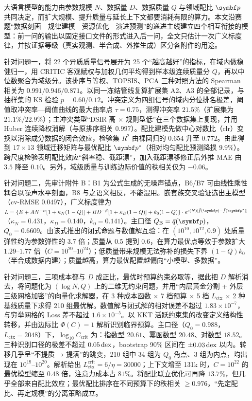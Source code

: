 大语言模型的能力由参数规模 $N$、数据量 $D$、数据质量 $Q$ 与领域配比 $\bp$ 共同决定，而扩大规模、提升质量与延长上下文都要消耗有限的算力。本文沿赛题“数据刻画—规律建模—资源优化—演进预测”的递进主线建立四个相互衔接的模型：前一问的输出以固定接口文件的形式进入后一问，全文只估计一次广义标度律，并按证据等级（真实观测、半合成、外推生成）区分各附件的用途。

针对问题一，将 22 个异质质量信号展开为 25 个“越高越好”的指标，在域内做稳健归一，用 CRITIC 客观赋权与加权几何平均得到样本级连续质量分 $Q$，再以中位数聚合为域级分。该排序与等权、TOPSIS、PCA 三种对照方法的 Spearman 相关为 $0.991/0.946/0.871$。以同一冻结管线复算扩展集 A2、A3 的全部记录，与抽样集的 KS 检验 $p=0.60/0.12$。冲突定义为四组信号的域内分位排名极差，阈值取冲突率—阈值曲线的最大曲率点 $\tau=0.75$，测得冲突率 $21.5\%$（扩展集为 $21.1\%/22.9\%$）；主冲突类型“DSIR 高 × 规则型低”在三个数据集上复现，并用 Huber 连续降权消解（与原排序相关 $0.997$）。配比建模先做中心对数比（clr）变换以消除成分数据的闭合效应，检验集 $R^2$ 由裸回归的 $0.654$ 升至 $0.772$。由此得到 $17\times13$ 领域迁移矩阵与最优配比 $\bp^*$（相对均匀配比预测降损 $9.9\%$）。跨尺度检验表明配比效应“斜率稳、截距漂”，加入截距漂移修正后外推 MAE 由 $3.5$ 降至 $0.10$。另外，域级质量与训练边际价值的秩相关仅为 $-0.06$。

针对问题二，先审计附件 B：B1 为公式生成的无噪声锚点，B6/B7 可由线性乘性耦合以噪声水平刻画，B8 与之语义相反，不能混用。嵌套族交叉验证选出主模型（cv-RMSE $0.0497$），广义标度律为 $L=\{E+AN^{-\alpha}[1+\kappa_N(1-Q)]+BD^{-\beta}[1+\kappa_D(1-Q)]+k_0(1-Q)\}\cdot e^{s(N)[\bar f(\bp)-\bar f(\bp^*)]}$（$\kappa_N=0.431$，$\kappa_D=0.140$，$k_0=0.141$）。主口径 $Q_{\mathrm B}=\bar q(\bp)$，$Q_0=0.6609$。由该式推出的闭式命题与数值解互验：在 $(10^{10},10^{12},0.9)$ 处质量弹性约为参数弹性的 $3.7$ 倍；质量从 $0.5$ 提到 $0.6$，在算力最优点等效于参数扩大 $1.29$–$1.77$ 倍（$C=10^{20}$–$10^{24}$）；低质量带来规模无法弥补的损失下界 $(1-Q)k_0$（半合成数据内建）；质量越高，算力最优配置越偏向“小模型、多数据”。

针对问题三，三项成本都与 $D$ 成正比，最优时预算约束必取等，据此把 $D$ 解析消去，将问题化为 $(\log N,Q)$ 上的二维无约束问题，并用“内层黄金分割 + 外层三级网格加密”的向量化求解器，在 3 种成本函数 × 7 档预算 × 5 档 $L_{\mathrm{ctx}}$ × 2 种基线质量下求得 210 组最优解。数值解与闭式解的相对误差不超过 $1.83\times10^{-7}$，与穷举网格的 Loss 差不超过 $1.6\times10^{-5}$。以 KKT 活跃约束集的改变定义结构性转移，并由边际比 $\Phi(C)=1$ 解析识别临界预算。主口径（$Q_0=0.988$，$L_{\mathrm{ctx}}=2048$）下，$\log_{10}C_{\mathrm{crit}}$ 为：指数型 $20.61$、幂函数型 $20.48$、对数型 $18.52$。三种识别口径的极差不超过 $0.05\,\mathrm{dex}$，bootstrap 90\% 区间在 $\pm0.03\,\mathrm{dex}$ 以内。转移几乎呈“不提质 → 提满”的跳变，210 组中 34 组为 $Q_0$ 角点、3 组为内点，均出现在 $10^{19}$–$10^{20}$。解析给出 $L_{\mathrm{ctx}}^{\mathrm{crit}}=6/\eta=30000$；上下文增至 131k 时，$C=10^{22}$ 的最优模型缩至 $0.48$ 倍，注意力成本占 $81\%$。将配比联立优化可再降 $13.7\%$，但几乎全部来自配比效应；最优配比排序在不同预算下的秩相关 $\ge0.976$，“先定配比、再定规模”的分离策略成立。

